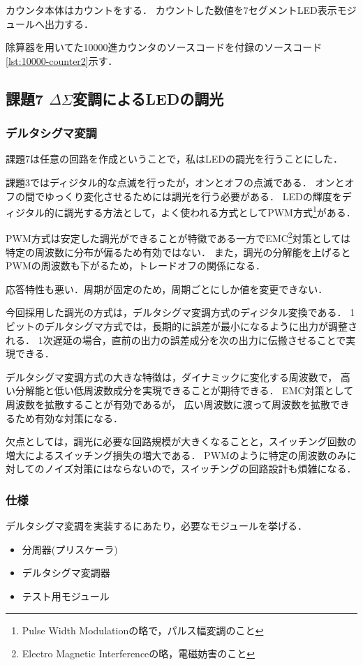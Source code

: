 カウンタ本体はカウントをする．
カウントした数値を7セグメントLED表示モジュールへ出力する．

除算器を用いてた10000進カウンタのソースコードを付録のソースコード\ref{lst:10000-counter2}示す．

\subsection{課題7 $\Delta\Sigma$変調によるLEDの調光}
\subsubsection{デルタシグマ変調}
課題7は任意の回路を作成ということで，私はLEDの調光を行うことにした．

課題3ではディジタル的な点滅を行ったが，オンとオフの点滅である．
オンとオフの間でゆっくり変化させるためには調光を行う必要がある．
LEDの輝度をディジタル的に調光する方法として，よく使われる方式としてPWM方式\footnote{Pulse Width Modulationの略で，パルス幅変調のこと}がある．

PWM方式は安定した調光ができることが特徴である一方でEMC\footnote{Electro Magnetic Interferenceの略，電磁妨害のこと}対策としては特定の周波数に分布が偏るため有効ではない．
また，調光の分解能を上げるとPWMの周波数も下がるため，トレードオフの関係になる．

応答特性も悪い．周期が固定のため，周期ごとにしか値を変更できない．

今回採用した調光の方式は，デルタシグマ変調方式のディジタル変換である．
1ビットのデルタシグマ方式では，長期的に誤差が最小になるように出力が調整される．
1次遅延の場合，直前の出力の誤差成分を次の出力に伝搬させることで実現できる．

デルタシグマ変調方式の大きな特徴は，ダイナミックに変化する周波数で，
高い分解能と低い低周波数成分を実現できることが期待できる．
EMC対策として周波数を拡散することが有効であるが，
広い周波数に渡って周波数を拡散できるため有効な対策になる．

欠点としては，調光に必要な回路規模が大きくなることと，スイッチング回数の増大によるスイッチング損失の増大である．
PWMのように特定の周波数のみに対してのノイズ対策にはならないので，スイッチングの回路設計も煩雑になる．

\subsubsection{仕様}
デルタシグマ変調を実装するにあたり，必要なモジュールを挙げる．

\begin{itemize}
\item 分周器(プリスケーラ)
\item デルタシグマ変調器
\item テスト用モジュール
\end{itemize}


